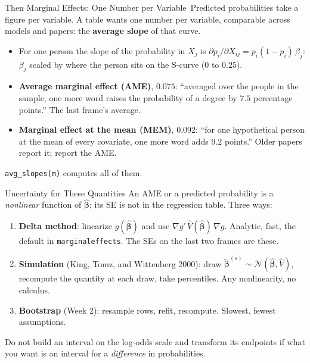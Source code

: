\documentclass[aspectratio=169,11pt,xcolor=dvipsnames]{beamer}
\newcommand{\srcp}[1]{{\scriptsize\color{gray}(#1)}}
\newcommand{\core}{\,\raisebox{0.6pt}{\textcolor{corestar}{$\bigstar$}}}
\begin{document}
\begin{frame}{Then Marginal Effects: One Number per Variable\core}
Predicted probabilities take a figure per variable. A table wants one
number per variable, comparable across models and papers: the
\textbf{average slope} of that curve.
\begin{itemize}\itemsep3pt
  \item For one person the slope of the probability in $X_j$ is
        $\partial p_i/\partial X_{ij} = p_i(1-p_i)\,\beta_j$: $\beta_j$
        scaled by where the person sits on the S-curve ($0$ to $0.25$).
  \item \textbf{Average marginal effect (AME)}, $0.075$: ``averaged over
        the people in the sample, one more word raises the probability of
        a degree by $7.5$ percentage points.'' The last frame's average.
  \item \textbf{Marginal effect at the mean (MEM)}, $0.092$: ``for one
        hypothetical person at the mean of every covariate, one more word
        adds $9.2$ points.'' Older papers report it; report the AME.
\end{itemize}
\texttt{avg\_slopes(m)} computes all of them.
\end{frame}

\begin{frame}{Uncertainty for These Quantities}
An AME or a predicted probability is a \emph{nonlinear} function of
$\hat{\bm\beta}$; its SE is not in the regression table. Three ways:
\begin{enumerate}\itemsep4pt
  \item \textbf{Delta method}: linearize $g(\hat{\bm\beta})$ and use
        $\nabla g'\,\hat V(\hat{\bm\beta})\,\nabla g$. Analytic, fast, the
        default in \texttt{marginaleffects}. The SEs on the last two frames
        are these.
  \item \textbf{Simulation} \srcp{King, Tomz, and Wittenberg 2000}: draw
        $\tilde{\bm\beta}^{(s)} \sim \mathcal N(\hat{\bm\beta}, \hat V)$,
        recompute the quantity at each draw, take percentiles. Any
        nonlinearity, no calculus.
  \item \textbf{Bootstrap} (Week 2): resample rows, refit, recompute.
        Slowest, fewest assumptions.
\end{enumerate}
\vskip3pt
\alert{Do not} build an interval on the log-odds scale and transform its
endpoints if what you want is an interval for a \emph{difference} in
probabilities.
\end{frame}
\end{document}

